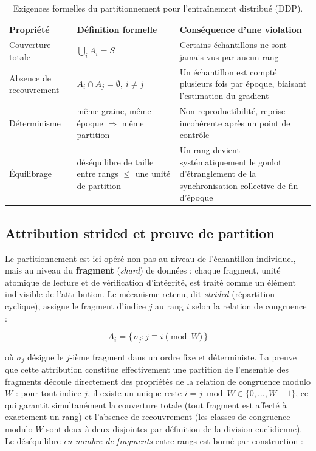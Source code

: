 \documentclass[12pt,a4paper]{report}
\begin{document}
\begin{table}[htbp]
  \centering
  \renewcommand{\arraystretch}{1.5} 
  \begin{tabular}{|p{3.5cm}|p{5cm}|p{6.5cm}|}
    \hline
    \textbf{Propriété} & \textbf{Définition formelle} & \textbf{Conséquence d'une violation} \\
    \hline
    Couverture totale & $\bigcup_i A_i = S$ & Certains échantillons ne sont jamais vus par aucun rang \\
    \hline
    Absence de recouvrement & $A_i \cap A_j = \emptyset,\ i \neq j$ & Un échantillon est compté plusieurs fois par époque, biaisant l'estimation du gradient \\
    \hline
    Déterminisme & même graine, même époque $\Rightarrow$ même partition & Non-reproductibilité, reprise incohérente après un point de contrôle \\
    \hline
    Équilibrage & déséquilibre de taille entre rangs $\leq$ une unité de partition & Un rang devient systématiquement le goulot d'étranglement de la synchronisation collective de fin d'époque \\
    \hline
  \end{tabular}
  \vspace{0.2cm}
  \caption{Exigences formelles du partitionnement pour l'entraînement distribué (DDP).}
  \label{tab:ddp_requirements}
\end{table}

\subsection{Attribution strided et preuve de partition}

Le partitionnement est ici opéré non pas au niveau de l'échantillon individuel, mais au niveau du \textbf{fragment} (\textit{shard}) de données : chaque fragment, unité atomique de lecture et de vérification d'intégrité, est traité comme un élément indivisible de l'attribution. Le mécanisme retenu, dit \textit{strided} (répartition cyclique), assigne le fragment d'indice $j$ au rang $i$ selon la relation de congruence :

\begin{equation}
\label{eq:strided}
A_i = \{\, \sigma_j : j \equiv i \pmod{W} \,\}
\end{equation}

où $\sigma_j$ désigne le $j$-ième fragment dans un ordre fixe et déterministe. La preuve que cette attribution constitue effectivement une partition de l'ensemble des fragments découle directement des propriétés de la relation de congruence modulo $W$ : pour tout indice $j$, il existe un unique reste $i = j \bmod W \in \{0, \ldots, W-1\}$, ce qui garantit simultanément la couverture totale (tout fragment est affecté à exactement un rang) et l'absence de recouvrement (les classes de congruence modulo $W$ sont deux à deux disjointes par définition de la division euclidienne). Le déséquilibre \emph{en nombre de fragments} entre rangs est borné par construction :
\end{document}
